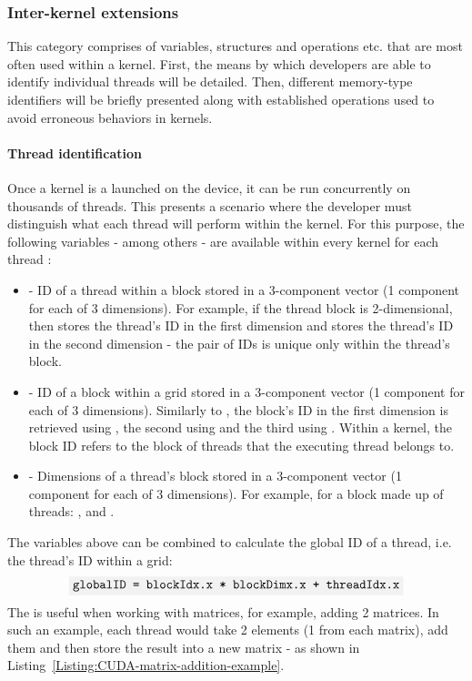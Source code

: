 \subsubsection{Inter-kernel extensions \TO}
This category comprises of variables, structures and operations etc. that are most often used within a kernel. First, the means by which developers are able to identify individual threads will be detailed. Then, different memory-type identifiers will be briefly presented along with established operations used to avoid erroneous behaviors in kernels.

\paragraph{Thread identification}
Once a kernel is a launched on the device, it can be run concurrently on thousands of threads. This presents a scenario where the developer must distinguish what each thread will perform within the kernel. For this purpose, the following variables - among others - are available within every kernel for each thread \cite{NVIDIAMay2022}:

\begin{itemize}
	\item {} - ID of a thread within a block stored in a 3-component vector (1 component for each of 3 dimensions). For example, if the thread block is 2-dimensional, then  stores the thread's ID in the first dimension and  stores the thread's ID in the second dimension - the pair of IDs is unique only within the thread's block.
	\item {} - ID of a block within a grid stored in a 3-component vector (1 component for each of 3 dimensions). Similarly to , the block's ID in the first dimension is retrieved using , the second using  and the third using . Within a kernel, the block ID refers to the block of threads that the executing thread belongs to.
	\item {} - Dimensions of a thread's block stored in a 3-component vector (1 component for each of 3 dimensions). For example, for a block made up of  threads: ,  and .
\end{itemize}

The variables above can be combined to calculate the global ID of a thread, i.e. the thread's ID within a grid:
$$\code{globalID = blockIdx.x * blockDimx.x + threadIdx.x}$$
The  is useful when working with matrices, for example, adding 2 matrices. In such an example, each thread would take 2 elements (1 from each matrix), add them and then store the result into a new matrix - as shown in Listing~\ref{Listing:CUDA-matrix-addition-example}.

